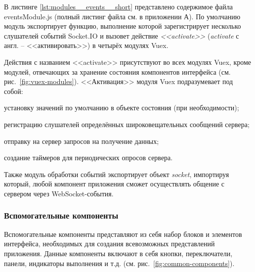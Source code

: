 В листинге \ref{lst:modules__events__short} представлено содержимое файла eventsModule.js (полный листинг файла см. в приложении А). По умолчанию модуль экспортирует функцию, выполнение которой зарегистрирует несколько слушателей событий Socket.IO и вызовет действие \emph{<<activate>>} (\emph{activate} с англ. -- <<активировать>>) в четырёх модулях Vuex.

Действия с названием <<activate>> присутствуют во всех модулях Vuex, кроме модулей, отвечающих за хранение состояния компонентов интерфейса (см. рис.~\ref{fig:vuex-modules}). <<Активация>> модуля Vuex подразумевает под собой:
\begin{dashitemize}
  \item установку значений по умолчанию в объекте состояния (при необходимости);
  \item регистрацию слушателей определённых широковещательных сообщений сервера;
  \item отправку на сервер запросов на получение данных;
  \item создание таймеров для периодических опросов сервера.
\end{dashitemize}



Также модуль обработки событий экспортирует объект \emph{socket}, импортируя который, любой компонент приложения сможет осуществлять общение с сервером через WebSocket-события.


\subsubsection{Вспомогательные компоненты}

Вспомогательные компоненты представляют из себя набор блоков и элементов интерфейса, необходимых для создания всевозможных представлений приложения. Данные компоненты включают в себя кнопки, переключатели, панели, индикаторы выполнения и т.д. (см. рис.~\ref{fig:common-components}).

